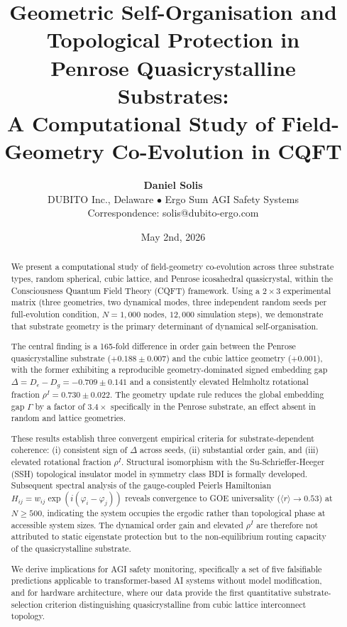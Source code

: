\documentclass[11pt,a4paper]{article}
\title{\textbf{Geometric Self-Organisation and Topological Protection in\\Penrose Quasicrystalline Substrates:}\\[0.5em]
\large A Computational Study of Field-Geometry Co-Evolution in CQFT}
\author{\textbf{Daniel Solis}\\[0.3em]
\normalsize DUBITO Inc., Delaware \quad $\bullet$ \quad Ergo Sum AGI Safety Systems\\[0.2em]
\small Correspondence: solis@dubito-ergo.com}
\date{May 2nd, 2026}
\begin{document}
\maketitle
\thispagestyle{fancy}

\begin{abstract}
We present a computational study of field-geometry co-evolution across three substrate types, random spherical, cubic lattice, and Penrose icosahedral quasicrystal, within the Consciousness Quantum Field Theory (CQFT) framework. Using a $2\times3$ experimental matrix (three geometries, two dynamical modes, three independent random seeds per full-evolution condition, $N = 1{,}000$ nodes, $12{,}000$ simulation steps), we demonstrate that substrate geometry is the primary determinant of dynamical self-organisation.

The central finding is a 165-fold difference in order gain between the Penrose quasicrystalline substrate ($+0.188 \pm 0.007$) and the cubic lattice geometry ($+0.001$), with the former exhibiting a reproducible geometry-dominated signed embedding gap $\Delta = D_e - D_g = -0.709 \pm 0.141$ and a consistently elevated Helmholtz rotational fraction $\rho^I = 0.730 \pm 0.022$. The geometry update rule reduces the global embedding gap $\Gamma$ by a factor of $3.4\times$ specifically in the Penrose substrate, an effect absent in random and lattice geometries.

These results establish three convergent empirical criteria for substrate-dependent coherence: (i) consistent sign of $\Delta$ across seeds, (ii) substantial order gain, and (iii) elevated rotational fraction $\rho^I$. Structural isomorphism with the Su-Schrieffer-Heeger (SSH) topological insulator model in symmetry class BDI is formally developed. Subsequent spectral analysis of the gauge-coupled Peierls Hamiltonian $H_{ij} = w_{ij} \exp(i(\varphi_i - \varphi_j))$ reveals convergence to GOE universality ($\langle r\rangle \to 0.53$) at $N \geq 500$, indicating the system occupies the ergodic rather than topological phase at accessible system sizes. The dynamical order gain and elevated $\rho^I$ are therefore not attributed to static eigenstate protection but to the non-equilibrium routing capacity of the quasicrystalline substrate.

We derive implications for AGI safety monitoring, specifically a set of five falsifiable predictions applicable to transformer-based AI systems without model modification, and for hardware architecture, where our data provide the first quantitative substrate-selection criterion distinguishing quasicrystalline from cubic lattice interconnect topology.
\end{abstract}
\end{document}
